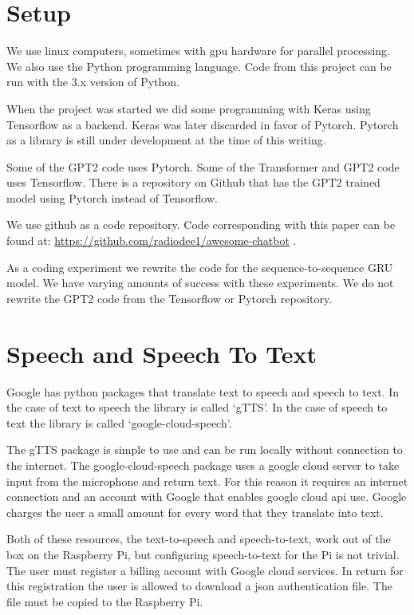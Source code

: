 \section{Setup}

We use linux computers, sometimes with gpu hardware for parallel processing.
We also use the Python programming language. Code from this project
can be run with the 3.x version of Python.

When the project was started we did some programming with Keras using
Tensorflow as a backend. Keras was later discarded in favor of Pytorch.
Pytorch as a library is still under development at the time of this
writing.

Some of the GPT2 code uses Pytorch. Some of the Transformer and GPT2 code uses Tensorflow. There is a repository on Github that has the GPT2 trained model using Pytorch instead of Tensorflow.

We use github as a code repository. Code corresponding with this paper
can be found at: \href{https://github.com/radiodee1/awesome-chatbot}{https://github.com/radiodee1/awesome-chatbot}
. 

As a coding experiment we rewrite the code for the sequence-to-sequence GRU model. We have varying amounts of success with these experiments. We do not rewrite the GPT2 code from the Tensorflow or Pytorch repository.

\section{Speech and Speech To Text}

Google has python packages that translate text to speech and speech to text. In the case of text to speech the library is called `gTTS'. In the case of speech to text the library is called `google-cloud-speech'. 

The gTTS package is simple to use and can be run locally without connection to the internet. The google-cloud-speech package uses a google cloud server to take input from the microphone and return text. For this reason it requires an internet connection and an account with Google that enables google cloud api use. Google charges the user a small amount for every word that they translate into text. 

Both of these resources, the text-to-speech and speech-to-text, work out of the box on the Raspberry Pi, but configuring speech-to-text for the Pi is not trivial. The user must register a billing account with Google cloud services. In return for this registration the user is allowed to download a json authentication file. The file must be copied to the Raspberry Pi. 

